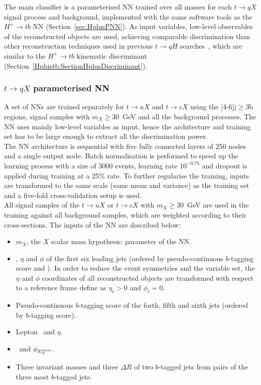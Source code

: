 The main classifier is a parameterised NN trained over all masses for each $t\to qX$ signal process and background, implemented with the same software tools as the $H^+\to tb$ NN (Section~\ref{sec:HplusPNN}). As input variables, low-level observables of the reconstructed objects are used, achieving comparable discrimination than other reconstruction techniques used in previous $t\to qH$ searches~\cite{TOPQ-2017-07}, which are similar to the $H^+\to tb$ kinematic discriminant (Section~\ref{Hplustb:SectionHplusDiscriminant}).

\subsubsection{$t\to qX$ parameterised NN}

A set of NNs are trained separately for $t\to uX$ and $t\to cX$ using the [4-6]j$\geq$3b regions, signal samples with $m_X\geq$30~GeV and all the background processes. The NN uses mainly low-level variables as input, hence the architecture and training set has to be large enough to extract all the discrimination power.\\

The NN architecture is sequential with five fully connected layers of 250 nodes and a single output node. Batch normalisation is performed to speed up the learning process with a size of 3000 events, learning rate $10^{-0.75}$ and dropout is applied during training at a 25\% rate. To further regularise the training, inputs are transformed to the same scale (same mean and variance) as the training set and a five-fold cross-validation setup is used.\\

All signal samples of the $t\to uX$ or $t\to cX$ with $m_X\geq$30~GeV are used in the training against all background samples, which are weighted according to their cross-sections. The inputs of the NN are described below:

\begin{itemize}
    \item $m_X$, the $X$ scalar mass hypothesis: parameter of the NN.
    \item \pT, $\eta$ and $\phi$ of the first six leading jets (ordered by pseudo-continuous $b$-tagging score and \pT). In order to reduce the event symmetries and the variable set, the $\eta$ and $\phi$ coordinates of all reconstructed objects are transformed with respect to a reference frame define as $\eta_{\ell}>0$ and $\phi_{\ell}=0$.
    \item Pseudo-continuous $b$-tagging score of the forth, fifth and sixth jets (ordered by $b$-tagging score).
    \item Lepton \pT\ and $\eta$.
    \item \MET\ and $\phi_{E_{\text{T}}^{\text{miss}}}$.
    \item Three invariant masses and three $\Delta R$ of two $b$-tagged jets from pairs of the three most $b$-tagged jets. 
\end{itemize}

